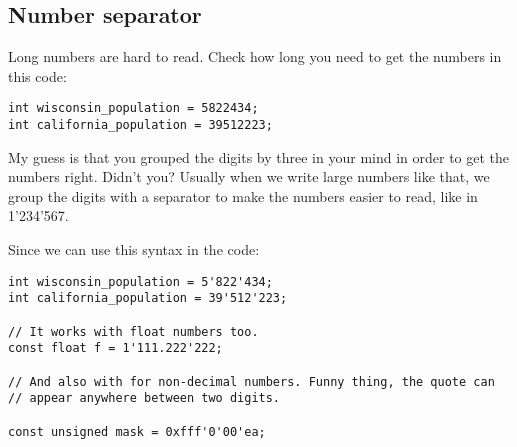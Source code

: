 \subsection{Number separator}
\label{number-separator}

\problemtitle

Long numbers are hard to read. Check how long you need to get the
numbers in this  code:

\begin{lstlisting}
int wisconsin_population = 5822434;
int california_population = 39512223;
\end{lstlisting}

My guess is that you grouped the digits by three in your mind in order
to get the numbers right. Didn't you? Usually when we write large
numbers like that, we group the digits with a separator to make the
numbers easier to read, like in 1'234'567.

\solutiontitle

Since  we can use this syntax in the code:

\begin{lstlisting}
int wisconsin_population = 5'822'434;
int california_population = 39'512'223;

// It works with float numbers too.
const float f = 1'111.222'222;

// And also with for non-decimal numbers. Funny thing, the quote can
// appear anywhere between two digits.

const unsigned mask = 0xfff'0'00'ea;
\end{lstlisting}
